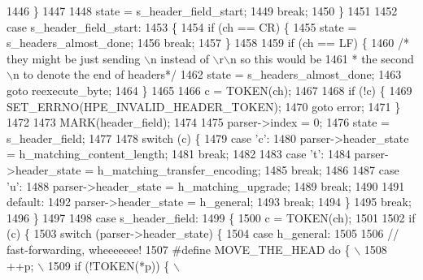 \begin{DoxyCode}
1446         \}
1447 
1448         state = s_header_field_start;
1449         \textcolor{keywordflow}{break};
1450       \}
1451 
1452       \textcolor{keywordflow}{case} s_header_field_start:
1453       \{
1454         \textcolor{keywordflow}{if} (ch == CR) \{
1455           state = s_headers_almost_done;
1456           \textcolor{keywordflow}{break};
1457         \}
1458 
1459         \textcolor{keywordflow}{if} (ch == LF) \{
1460           \textcolor{comment}{/* they might be just sending \(\backslash\)n instead of \(\backslash\)r\(\backslash\)n so this would be}
1461 \textcolor{comment}{           * the second \(\backslash\)n to denote the end of headers*/}
1462           state = s_headers_almost_done;
1463           \textcolor{keywordflow}{goto} reexecute\_byte;
1464         \}
1465 
1466         c = TOKEN(ch);
1467 
1468         \textcolor{keywordflow}{if} (!c) \{
1469           SET_ERRNO(HPE_INVALID_HEADER_TOKEN);
1470           \textcolor{keywordflow}{goto} error;
1471         \}
1472 
1473         MARK(header\_field);
1474 
1475         parser->index = 0;
1476         state = s_header_field;
1477 
1478         \textcolor{keywordflow}{switch} (c) \{
1479           \textcolor{keywordflow}{case} \textcolor{charliteral}{'c'}:
1480             parser->header_state = h_matching_content_length;
1481             \textcolor{keywordflow}{break};
1482 
1483           \textcolor{keywordflow}{case} \textcolor{charliteral}{'t'}:
1484             parser->header_state = h_matching_transfer_encoding;
1485             \textcolor{keywordflow}{break};
1486 
1487           \textcolor{keywordflow}{case} \textcolor{charliteral}{'u'}:
1488             parser->header_state = h_matching_upgrade;
1489             \textcolor{keywordflow}{break};
1490 
1491           \textcolor{keywordflow}{default}:
1492             parser->header_state = h_general;
1493             \textcolor{keywordflow}{break};
1494         \}
1495         \textcolor{keywordflow}{break};
1496       \}
1497 
1498       \textcolor{keywordflow}{case} s_header_field:
1499       \{
1500         c = TOKEN(ch);
1501 
1502         \textcolor{keywordflow}{if} (c) \{
1503           \textcolor{keywordflow}{switch} (parser->header_state) \{
1504             \textcolor{keywordflow}{case} h_general:
1505 
1506               \textcolor{comment}{// fast-forwarding, wheeeeeee!}
1507 \textcolor{preprocessor}{              #define MOVE\_THE\_HEAD do \{ \(\backslash\)}
1508 \textcolor{preprocessor}{                ++p;                     \(\backslash\)}
1509 \textcolor{preprocessor}{                if (!TOKEN(*p)) \{        \(\backslash\)}

\end{DoxyCode}
